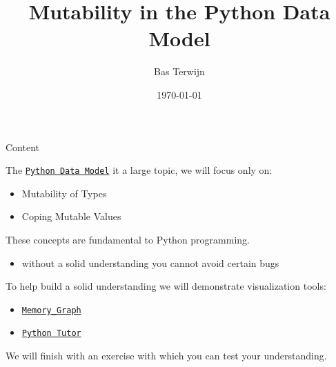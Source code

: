 \documentclass[10pt, colorlinks=true, urlcolor=blue]{beamer}
\title{Mutability in the Python Data Model}
\author{Bas Terwijn}
\date{\today}
\begin{document}
\begin{frame}
    \titlepage
\end{frame}

\begin{frame}{Content}

  The \href{https://docs.python.org/3/reference/datamodel.html}{\texttt{Python Data Model}} it a large topic, we will focus only on:
  \begin{itemize}
  \item Mutability of Types
  \item Coping Mutable Values
  \end{itemize}

  \vspace{2em}
  
  These concepts are fundamental to Python programming.
  \begin{itemize}
    \item without a solid understanding you cannot avoid certain bugs
  \end{itemize}

  \vspace{2em}
  
  To help build a solid understanding we will demonstrate visualization tools:
  \begin{itemize}
  \item \href{https://pypi.org/project/memory-graph/}{\texttt{Memory\_Graph}}
  \item \href{https://pythontutor.com/}{\texttt{Python Tutor}}
  \end{itemize}

  \vspace{2em}

  We will finish with an exercise with which you can test your understanding.
\end{frame}
\end{document}
